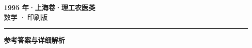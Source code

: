 \documentclass[zihao=5, a4paper]{ctexart}
\begin{document}
\begin{center}
  {\Large\bfseries 1995 年·上海卷·理工农医类}\\[4pt]
  {\large 数学 · 印刷版}
\end{center}
\medskip
{}

\par\bigskip\hrule\bigskip
{}
\begin{center}{\large\bfseries 参考答案与详细解析}\end{center}
\smallskip

\end{document}
